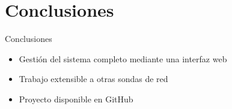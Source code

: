 \section{Conclusiones}

\begin{frame}{Conclusiones}
  \begin{itemize}[<alert@+>]
    \item Gestión del sistema completo mediante una interfaz web
    \item Trabajo extensible a otras sondas de red
    \item Proyecto disponible en GitHub
  \end{itemize}
\end{frame}
